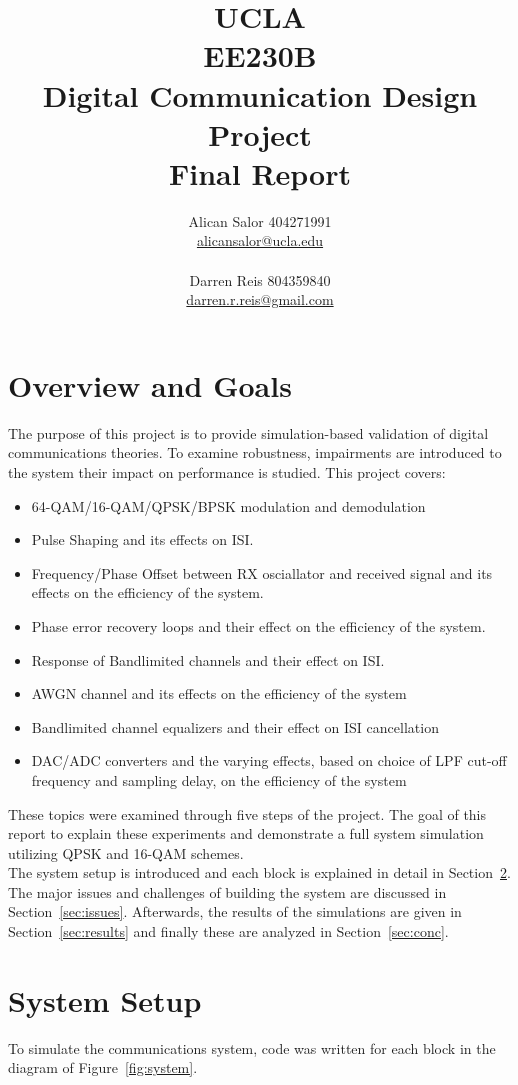 \documentclass[]{article}
\title{UCLA\\EE230B\\Digital Communication Design Project\\Final Report}
\author{Alican Salor 404271991 \\  \href{mailto:alicansalor@ucla.edu}{alicansalor@ucla.edu} \\ \\
Darren Reis 804359840 \\
\href{mailto:darrer.r.reis@gmail.com}{darren.r.reis@gmail.com} }
\begin{document}
\maketitle

\newpage
\tableofcontents
\newpage
\section{Overview and Goals}
\label{sec:overview}

The purpose of this project is to provide simulation-based validation of digital communications theories.  To examine robustness, impairments are introduced to the system their impact on performance is studied. This project covers:
\begin{itemize}
\item 64-QAM/16-QAM/QPSK/BPSK modulation and demodulation
\item Pulse Shaping and its effects on ISI.
\item Frequency/Phase Offset between RX osciallator and received signal and its effects on the efficiency of the system.
\item Phase error recovery loops and their effect on the efficiency of the system.
\item Response of Bandlimited channels and their effect on ISI.
\item AWGN channel and its effects on the efficiency of the system
\item Bandlimited channel equalizers and their effect on ISI cancellation
\item DAC/ADC converters and the varying effects, based on choice of LPF cut-off frequency and sampling delay, on the efficiency of the system  
\end{itemize}

These topics were examined through five steps of the project. The goal of this report to explain these experiments and demonstrate a full system simulation utilizing QPSK and 16-QAM schemes.\\

The system setup is introduced and each block is explained in detail in Section~\ref{sec:setup}.  The major issues and challenges of building the system are discussed in Section~\ref{sec:issues}. Afterwards, the results of the simulations are given in Section~\ref{sec:results} and finally these are analyzed in Section~\ref{sec:conc}.  

\newpage
\section{System Setup}
\label{sec:setup}
To simulate the communications system, code was written for each block in the diagram of Figure~\ref{fig:system}.
 
\end{document}
